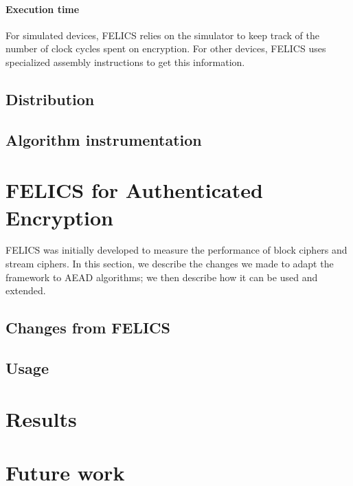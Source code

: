 \documentclass{article}
\begin{document}
\paragraph{Execution time}

For simulated devices, FELICS relies on the simulator to keep track of
the number of clock cycles spent on encryption.  For other devices,
FELICS uses specialized assembly instructions to get this information.

\subsection{Distribution}
\label{sec:felics/dist}

\subsection{Algorithm instrumentation}
\label{sec:felics/adding-algos}

\section{FELICS for Authenticated Encryption}
\label{sec:felics-ae}

FELICS was initially developed to measure the performance of block
ciphers and stream ciphers.  In this section, we describe the changes
we made to adapt the framework to AEAD algorithms; we then describe
how it can be used and extended.

\subsection{Changes from FELICS}
\label{sec:felics-ae/diff-felics}

\subsection{Usage}
\label{sec:felics-ae/usage}

\section{Results}
\label{sec:results}

\section{Future work}
\label{sec:future}



\end{document}
